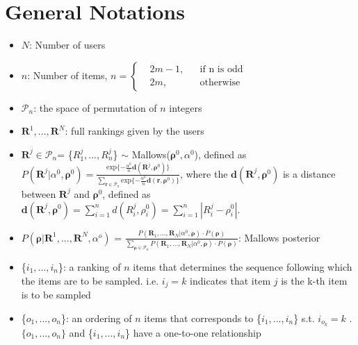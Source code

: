 \documentclass[11pt, oneside]{article}   	%
\title{}
\author{}
\date{}							%
\begin{document}
\maketitle 
\section{General Notations}

\begin{itemize}

	\item {$N$: Number of users}
	
	\item {$n$: Number of items,    $
	n = \left \{
	\begin{aligned}
	&2m-1, && \text{if n is odd} \\
	&2m, && \text{otherwise}
	\end{aligned} \right.
	$}
	
	\item{$\mathcal{P}_n$: the space of permutation of $n$ integers}
	\item {$\bm{R}^1,...,\bm{R}^N$: full rankings given by the users}
	
	
	\item {$\bm{R}^j \in \mathcal{P}_n$= \{$R^j_1,...,R^j_n$\} $\sim$ Mallows($\bm{\rho}^0, \alpha^0$), defined as 
	$P(\bm{R}^j|\alpha^0, \bm{\rho}^0) = \frac{\text{exp}\{-\frac{\alpha^0}{n}\bm{d}(\bm{R}^j, \bm{\rho}^0)\}}{\sum\limits_{\bm{r}\in \mathcal{P}_n}\text{exp}\{-\frac{\alpha^0}{n}\bm{d}(\bm{r}, \bm{\rho}^0)\}}$, where the $\bm{d}(\bm{R}^j, \bm{\rho}^0)$ is a distance between $\bm{R}^j$ and $\bm{\rho}^0$, defined as $\bm{d}(\bm{R}^j, \bm{\rho}^0) = \sum\limits_{i = 1}^{n}d(R^j_i, \rho^0_i) = \sum\limits_{i = 1}^{n}|R^j_i - \rho^0_i |$. }
	
	
	\item {$P(\bm{\rho}|\bm{R}^1,...,\bm{R}^N,\alpha^o)$ = $\frac{P(\bm{R}_1, ...,\bm{R}_N|\alpha^0, \bm{\rho})\cdot P(\bm{\rho})}{\sum\limits_{\bm{\rho}\in\mathcal{P}_n}P(\bm{R}_1, ...,\bm{R}_N|\alpha^0, \bm{\rho})\cdot P(\bm{\rho})}$: Mallows posterior}
	
	
	\item{\{$i_1, ..., i_n$\}: a ranking of $n$ items that determines the sequence following which the items are to be sampled. i.e. $i_j = k$ indicates that item $j$ is the k-th item is to be sampled}
	
	\item{ \{$o_1, ..., o_n$\}: an ordering of $n$ items that corresponds to \{$i_1, ..., i_n$\} s.t. $i_{o_k} = k$ }. $\{o_1, ...,o_n\}$ and \{$i_1, ..., i_n$\} have a one-to-one relationship
	

\end{itemize}
\end{document}
